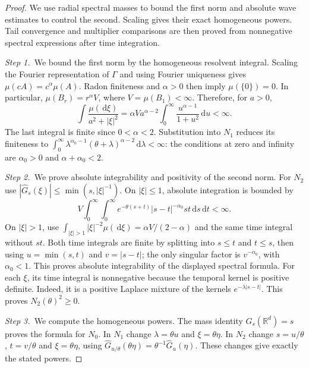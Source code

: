 \documentclass[12pt,oneside,openany]{book}
\numberwithin{equation}{section}
\theoremstyle{nogostyle}
\theoremstyle{definition}
\newcommand{\R}{\mathbb{R}}
\newcommand{\ud}{\,\mathrm{d}}
\begin{document}
\begin{proof}
  We use radial spectral masses to bound the first norm and absolute wave
  estimates to control the second. Scaling gives their exact homogeneous
  powers. Tail convergence and multiplier comparisons are then proved from
  nonnegative spectral expressions after time integration.


  \medskip
  \noindent\textit{Step 1.~}We bound the first norm by the homogeneous
  resolvent integral.
  Scaling the Fourier representation of $\Gamma$ and using Fourier uniqueness
  gives $\mu(cA) = c^\alpha\mu(A)$. Radon finiteness and $\alpha > 0$ then imply
  $\mu(\{0\}) = 0$. In particular, $\mu(B_r) = r^\alpha V$, where $V = \mu(B_1)
  < \infty$. Therefore, for $a > 0$,
  \[
    \int\frac{\mu(\ud\xi)}{a^2+|\xi|^2}
    =\alpha V a^{\alpha-2}
    \int_0^\infty\frac{u^{\alpha-1}}{1+u^2}\ud u<\infty.
  \]
  The last integral is finite since $0 < \alpha < 2$. Substitution into $N_1$
  reduces its finiteness to
  $\int_0^\infty\lambda^{\alpha_0-1}(\theta+\lambda)^{\alpha-2} \ud\lambda <
  \infty$: the conditions at zero and infinity are $\alpha_0 > 0$ and
  $\alpha+\alpha_0 < 2$.


  \medskip
  \noindent\textit{Step 2.~}We prove absolute integrability and positivity of
  the second norm.
  For $N_2$ use $|\widehat{G}_s(\xi)| \le \min(s,|\xi|^{-1})$. On $|\xi| \le 1$,
  absolute integration is bounded by
  \[
    V\int_0^\infty\int_0^\infty
    e^{-\theta(s+t)}|s-t|^{-\alpha_0}st\ud s\ud t<\infty.
  \]
  On $|\xi| > 1$, use $\int_{|\xi|>1}|\xi|^{-2}\mu(\ud\xi) = \alpha
  V/(2-\alpha)$ and the same time integral without $st$. Both time integrals are
  finite by splitting into $s \le t$ and $t \le s$, then using $u = \min(s,t)$
  and $v = |s-t|$; the only singular factor is $v^{-\alpha_0}$, with $\alpha_0 <
  1$. This proves absolute integrability of the displayed spectral formula. For
  each $\xi$, its time integral is nonnegative because the temporal kernel is
  positive definite. Indeed, it is a positive Laplace mixture of the kernels
  $e^{-\lambda|s-t|}$. This proves $N_2(\theta)^2 \ge 0$.


  \medskip
  \noindent\textit{Step 3.~}We compute the homogeneous powers.
  The mass identity $G_s(\R^d) = s$ proves the formula for $N_0$. In $N_1$
  change $\lambda = \theta u$ and $\xi = \theta\eta$. In $N_2$ change $s =
  u/\theta$, $t = v/\theta$ and $\xi = \theta\eta$, using
  $\widehat{G}_{u/\theta}(\theta\eta) = \theta^{-1}\widehat{G}_u(\eta)$. These
  changes give exactly the stated powers.


\end{proof}
\end{document}
